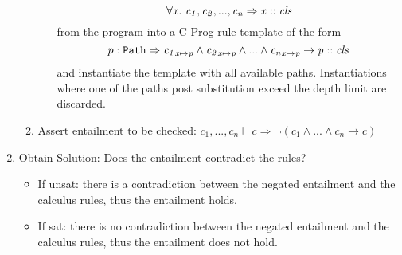 \documentclass[a4paper]{article}
\begin{document}
\begin{enumerate}
\begin{enumerate}
\begin{itemize}
            \[  \forall \mathit{x}.\ \mathit{c_1, c_2, ..., c_n} \Rightarrow \mathit{\mathit{x} :: \mathit{cls}} \]
            from the program into a C-Prog rule template of the form
            \[ p:\mathtt{Path} \Rightarrow \mathit{c_1}_{\mathit{x} \mapsto \mathit{p}} \land \mathit{c_2}_{\mathit{x} \mapsto \mathit{p}} \land ... \land \mathit{c_n}_{\mathit{x} \mapsto \mathit{p}} \rightarrow \mathit{p} :: \mathit{cls} \]
            and instantiate the template with all available paths.
            Instantiations where one of the paths post substitution exceed the depth limit are discarded.
    \end{itemize}
    \item Assert entailment to be checked: $c_1,...,c_n \vdash c \Rightarrow \neg (c_1 \land ... \land c_n → c)$
  \end{enumerate}
  \item Obtain Solution: Does the entailment contradict the rules?
  \begin{itemize}
    \item If unsat: there is a contradiction between the negated entailment and the calculus rules, thus the entailment holds.
    \item If sat: there is no contradiction between the negated entailment and the calculus rules, thus the entailment does not hold.
  \end{itemize}
\end{enumerate}
\end{document}
